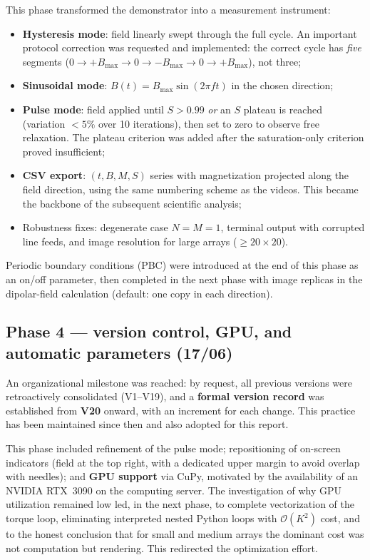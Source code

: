 \documentclass[11pt,a4paper]{article}
\begin{document}
This phase transformed the demonstrator into a measurement instrument:

\begin{itemize}
\item \textbf{Hysteresis mode}: field linearly swept through the full cycle. An important protocol correction was requested and implemented: the correct cycle has \emph{five} segments ($0 \to +B_{\max} \to 0 \to -B_{\max} \to 0 \to +B_{\max}$), not three;
\item \textbf{Sinusoidal mode}: $B(t) = B_{\max}\sin(2\pi f t)$ in the chosen direction;
\item \textbf{Pulse mode}: field applied until $S > 0.99$ \emph{or} an $S$ plateau is reached (variation $<5\%$ over 10 iterations), then set to zero to observe free relaxation. The plateau criterion was added after the saturation-only criterion proved insufficient;
\item \textbf{CSV export}: $(t, B, M, S)$ series with magnetization projected along the field direction, using the same numbering scheme as the videos. This became the backbone of the subsequent scientific analysis;
\item Robustness fixes: degenerate case $N = M = 1$, terminal output with corrupted line feeds, and image resolution for large arrays ($\geq 20 \times 20$).
\end{itemize}

Periodic boundary conditions (PBC) were introduced at the end of this phase as an on/off parameter, then completed in the next phase with image replicas in the dipolar-field calculation (default: one copy in each direction).

\subsection{Phase 4 --- version control, GPU, and automatic parameters (17/06)}

An organizational milestone was reached: by request, all previous versions were retroactively consolidated (V1--V19), and a \textbf{formal version record} was established from \textbf{V20} onward, with an increment for each change. This practice has been maintained since then and also adopted for this report.

This phase included refinement of the pulse mode; repositioning of on-screen indicators (field at the top right, with a dedicated upper margin to avoid overlap with needles); and \textbf{GPU support} via CuPy, motivated by the availability of an NVIDIA RTX~3090 on the computing server. The investigation of why GPU utilization remained low led, in the next phase, to complete vectorization of the torque loop, eliminating interpreted nested Python loops with $\mathcal{O}(K^2)$ cost, and to the honest conclusion that for small and medium arrays the dominant cost was not computation but rendering. This redirected the optimization effort.
\end{document}
